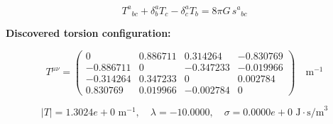 
\begin{equation}
  T^a{}_{bc} + \delta^a_b T_c - \delta^a_c T_b = 8\pi G \, s^a{}_{bc}
\end{equation}

\textbf{Discovered torsion configuration:}

\begin{equation}
  T^{\mu\nu} = \begin{pmatrix}
    0 & 0.886711 & 0.314264 & -0.830769 \\
    -0.886711 & 0 & -0.347233 & -0.019966 \\
    -0.314264 & 0.347233 & 0 & 0.002784 \\
    0.830769 & 0.019966 & -0.002784 & 0
  \end{pmatrix} \quad \text{m}^{-1}
\end{equation}

\begin{equation}
  |T| = 1.3024e+0 \text{ m}^{-1}, \quad
  \lambda = -10.0000, \quad
  \sigma = 0.0000e+0 \text{ J}\cdot\text{s/m}^3
\end{equation}